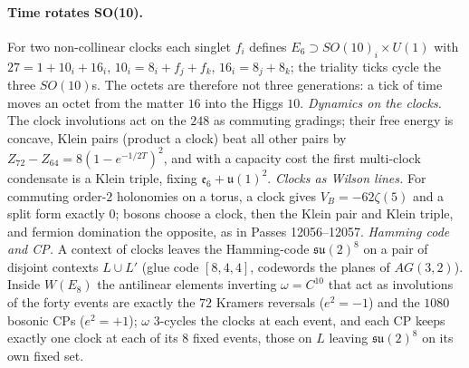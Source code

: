 \paragraph{Time rotates SO(10).}
For two non-collinear clocks each singlet $f_i$ defines $E_6\supset SO(10)_i\times U(1)$ with
$27=1+10_i+16_i$, $10_i=8_i+f_j+f_k$, $16_i=8_j+8_k$; the triality ticks cycle the three $SO(10)$s. The octets are
therefore not three generations: a tick of time moves an octet from the matter $16$ into the Higgs $10$. 
\emph{Dynamics on the clocks.} The clock involutions act on the $248$ as commuting gradings; their free energy is
concave, Klein pairs (product a clock) beat all other pairs by $Z_{72}-Z_{64}=8(1-e^{-1/2T})^2$, and with a capacity
cost the first multi-clock condensate is a Klein triple, fixing $\mathfrak e_6+\mathfrak u(1)^2$. 
\emph{Clocks as Wilson lines.} For commuting order-$2$ holonomies on a torus, a clock gives $V_B=-62\zeta(5)$ and a
split form exactly $0$; bosons choose a clock, then the Klein pair and Klein triple, and fermion domination the
opposite, as in Passes 12056--12057. 
\emph{Hamming code and CP.} A context of clocks leaves the Hamming-code $\mathfrak{su}(2)^8$ on a pair of disjoint
contexts $L\cup L'$ (glue code $[8,4,4]$, codewords the planes of $AG(3,2)$). Inside $W(E_8)$ the antilinear
elements inverting $\omega=C^{10}$ that act as involutions of the forty events are exactly the $72$ Kramers
reversals ($e^2=-1$) and the $1080$ bosonic CPs ($e^2=+1$); $\omega$ $3$-cycles the clocks at each event, and each CP
keeps exactly one clock at each of its $8$ fixed events, those on $L$ leaving $\mathfrak{su}(2)^8$ on its own fixed
set.  

